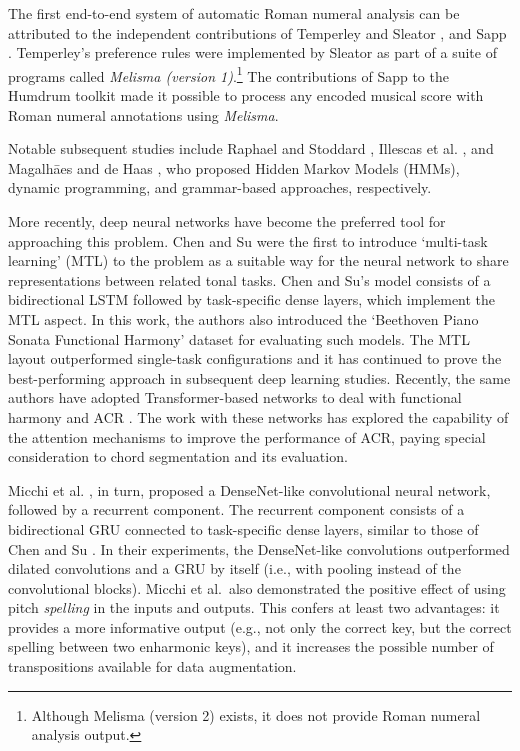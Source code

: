 

The first end-to-end system of automatic Roman numeral
analysis can be attributed to the independent contributions
of Temperley and Sleator \parencite{temperley2004cognition},
and Sapp \parencite{sapp2009tsroot}. Temperley's preference
rules were implemented by Sleator as part of a suite of
programs called \emph{Melisma (version
1)}.\footnote{Although Melisma (version 2) exists, it does
not provide Roman numeral analysis output.} The
contributions of Sapp to the Humdrum toolkit
\parencite{huron2002music} made it possible to process any
encoded musical score with Roman numeral annotations using
\emph{Melisma}.

Notable subsequent studies include Raphael and Stoddard
\parencite{raphael2004functional}, Illescas et al.
\parencite{illescas2007harmonic}, and Magalh\=aes and de
Haas \parencite{magalhaes2011functional}, who proposed
Hidden Markov Models (HMMs), dynamic programming, and
grammar-based approaches, respectively.

More recently, deep neural networks have become the
preferred tool for approaching this problem. Chen and Su
\parencite{chen2018functional} were the first to introduce
`multi-task learning' (MTL) \parencite{ruder2017overview} to
the problem as a suitable way for the neural network to
share representations between related tonal tasks. Chen and
Su's model consists of a bidirectional LSTM
\parencite{hochreiter1997long} followed by task-specific
dense layers, which implement the MTL aspect. In this work,
the authors also introduced the `Beethoven Piano Sonata
Functional Harmony' dataset for evaluating such models. The
MTL layout outperformed single-task configurations and it
has continued to prove the best-performing approach in
subsequent deep learning studies. Recently, the same authors
have adopted Transformer-based networks to deal with
functional harmony and ACR \parencite{chen2019harmony,
chen2021attend}. The work with these networks has explored
the capability of the attention mechanisms to improve the
performance of ACR, paying special consideration to chord
segmentation and its evaluation.

Micchi et al. \parencite{micchi2020not}, in turn, proposed a
DenseNet-like \parencite{huang2017densely} convolutional
neural network, followed by a recurrent component. The
recurrent component consists of a bidirectional GRU
\parencite{cho2014learning} connected to task-specific dense
layers, similar to those of Chen and Su
\parencite{chen2018functional}. In their experiments, the
DenseNet-like convolutions outperformed dilated convolutions
and a GRU by itself (i.e., with pooling instead of the
convolutional blocks). Micchi et al.~also demonstrated the
positive effect of using pitch \textit{spelling} in the
inputs and outputs. This confers at least two advantages: it
provides a more informative output (e.g., not only the
correct key, but the correct spelling between two enharmonic
keys), and it increases the possible number of
transpositions available for data augmentation.
